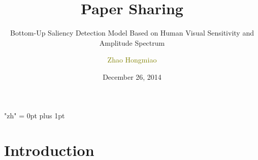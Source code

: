 \documentclass[notheorems,serif,table,compress]{beamer}  %
\begin{document}
\XeTeXlinebreaklocale "zh"         %
\XeTeXlinebreakskip = 0pt plus 1pt %
%

\title{Paper Sharing}
\subtitle{Bottom-Up Saliency Detection Model Based on Human Visual Sensitivity and Amplitude Spectrum}
\author[]{\textcolor{olive}{Zhao Hongmiao}}
\date[December 26, 2014]{December 26, 2014}
\frame{ \titlepage }
\def\hilite<#1>{\temporal<#1>{\color{blue!15}}{\color{black}}{\color{black}}}
\newcommand{\shadow}[2][purple]{\hskip5pt\shadowbox{\color{#1}\small \kai #2\vspace{3mm}}}
\newcommand{\colorrbox}[2][purple]{\doublebox{\color{#1}\small \kai#2}}


\section{Introduction}
\end{document}
